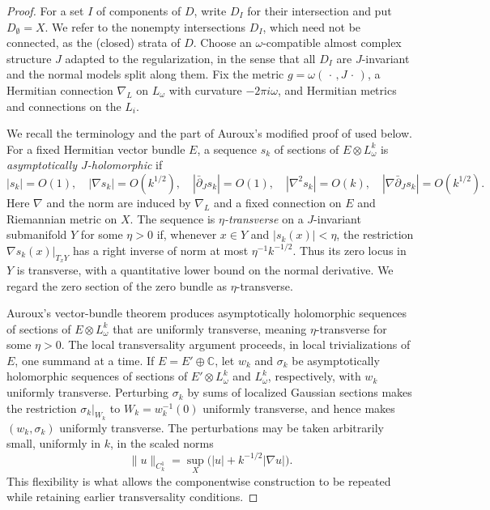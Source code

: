 \documentclass[11pt]{amsart}
\numberwithin{equation}{section}
\theoremstyle{plain}
\theoremstyle{definition}
\newcommand{\CC}{\mathbb{C}}
\newcommand{\delbar}{\bar\partial}
\begin{document}
\begin{proof}
For a set $I$ of components of $D$, write $D_I$ for their intersection and put
$D_\emptyset=X$. We refer to the nonempty intersections $D_I$, which need not be
connected, as the (closed) strata of $D$. Choose an $\omega$-compatible almost
complex structure $J$ adapted to the regularization, in the sense that all $D_I$
are $J$-invariant and the normal models split along them. Fix the metric
$g=\omega(\,\cdot\,,J\,\cdot\,)$, a Hermitian connection $\nabla_L$ on
$L_\omega$ with curvature $-2\pi i\omega$, and Hermitian metrics and connections
on the $L_i$.

We recall the terminology and the part of Auroux's modified proof of
\cite{Donaldson} used below. For a fixed Hermitian vector bundle $E$, a sequence
$s_k$ of sections of $E\otimes L_\omega^k$ is \emph{asymptotically
$J$-holomorphic} if
\begin{equation}
\label{Eqn: AH estimates}
|s_k|=O(1),\quad |\nabla s_k|=O(k^{1/2}),\quad
|\delbar_Js_k|=O(1),\quad |\nabla^2s_k|=O(k),\quad
|\nabla\delbar_Js_k|=O(k^{1/2}).
\end{equation}
Here $\nabla$ and the norm are induced by $\nabla_L$ and a fixed connection on
$E$ and Riemannian metric on $X$. The sequence is \emph{$\eta$-transverse} on a
$J$-invariant submanifold $Y$ for some $\eta>0$ if, whenever $x\in Y$ and
$|s_k(x)|<\eta$, the restriction $\nabla s_k(x)|_{T_xY}$ has a right inverse of
norm at most $\eta^{-1}k^{-1/2}$. Thus its zero locus in $Y$ is transverse, with
a quantitative lower bound on the normal derivative. We regard the zero section
of the zero bundle as $\eta$-transverse.

Auroux's vector-bundle theorem \cite[Thm.\,2]{Auroux} produces asymptotically
holomorphic sequences of sections of $E\otimes L_\omega^k$ that are uniformly
transverse, meaning $\eta$-transverse for some $\eta>0$. The local
transversality argument proceeds, in local trivializations of $E$, one summand
at a time. If $E=E'\oplus\CC$, let $w_k$ and $\sigma_k$ be asymptotically
holomorphic sequences of sections of $E'\otimes L_\omega^k$ and $L_\omega^k$,
respectively, with $w_k$ uniformly transverse. Perturbing $\sigma_k$ by sums of
localized Gaussian sections makes the restriction $\sigma_k|_{W_k}$ to
$W_k=w_k^{-1}(0)$ uniformly transverse, and hence makes $(w_k,\sigma_k)$
uniformly transverse. The perturbations may be taken arbitrarily small,
uniformly in $k$, in the scaled norms
\begin{equation}
\label{Eqn: scaled C1 norm}
\|u\|_{C^1_k}=\sup_X\bigl(|u|+k^{-1/2}|\nabla u|\bigr).
\end{equation}
This flexibility is what allows the componentwise construction to be repeated
while retaining earlier transversality conditions.


\end{proof}
\end{document}
